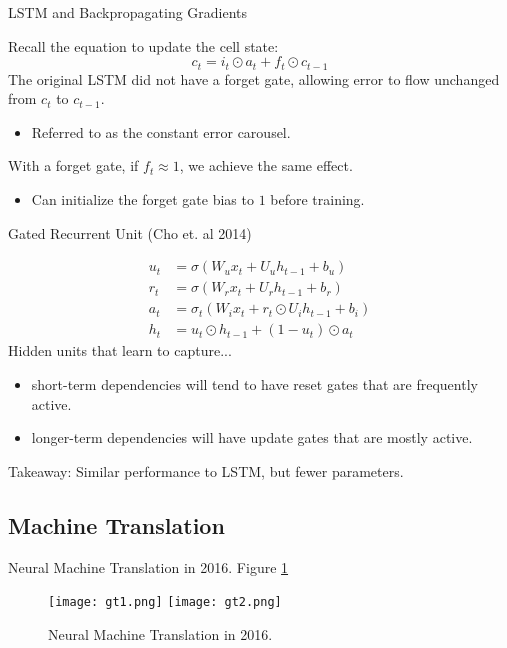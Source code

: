 \documentclass[english]{article}
\begin{document}
\item 
 {LSTM and Backpropagating Gradients}

Recall the equation to update the cell state:
$$c_t = i_t\odot a_t +f_t\odot c_{t-1}$$
The original LSTM did not have a forget gate, allowing error to flow unchanged from $c_t$ to $c_{t-1}$.
\begin{itemize}
\item Referred to as the constant error carousel.
\end{itemize}
With a forget gate, if $f_t\approx 1$, we achieve the same effect.
\begin{itemize}
\item Can initialize the forget gate bias to $1$ before training.
\end{itemize}
 

\item 
 {Gated Recurrent Unit (Cho et. al 2014)}


\begin{align*}
u_t &= \sigma(W_ux_t+U_uh_{t-1}+b_u)\\
r_t &= \sigma(W_rx_t+U_rh_{t-1}+b_r)\\
a_t &= \sigma_t(W_ix_t+r_t\odot U_ih_{t-1}+b_i)\\
h_t &= u_t\odot h_{t-1} + (1-u_t)\odot a_t
\end{align*}
Hidden units that learn to capture...
\begin{itemize}
\item short-term dependencies will tend to have reset gates that are frequently active. 
\item longer-term dependencies will have update gates that are mostly active.
\end{itemize}
Takeaway: Similar performance to LSTM, but fewer parameters.
 \eenum
 

\subsection{Machine Translation}
\benum
\item 
 {Neural Machine Translation in 2016}.  Figure \ref{Neural Machine Translation in 2016}

\begin{figure}
\centering
\texttt{[image: gt1.png]}
\vspace{5mm}
\texttt{[image: gt2.png]}
    \caption{Neural Machine Translation in 2016.}
    \label{Neural Machine Translation in 2016}
\end{figure}
 
\end{document}
